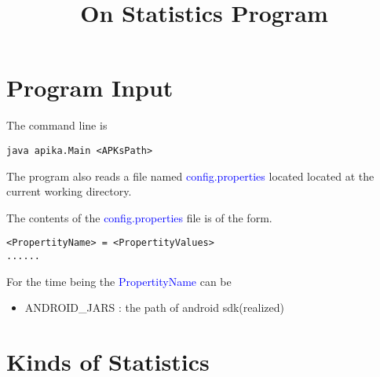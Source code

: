 \documentclass{article}
\title{On Statistics Program}
\begin{document}
\tableofcontents
\section{Program Input}
The command line is
\begin{verbatim}
java apika.Main <APKsPath>
\end{verbatim}
The program also reads a file named 
\textcolor{blue}{config.properties} located 
located at the current working directory. 
\par{
The contents of the \textcolor{blue}{config.properties} 
file is of the form.
\begin{verbatim}
<PropertityName> = <PropertityValues>
......
\end{verbatim}
For the time being the \textcolor{blue}{PropertityName} can be
\begin{itemize}
	\item ANDROID\_JARS : the path of android sdk(realized)
\end{itemize}
}

\section{Kinds of Statistics}
\end{document}
